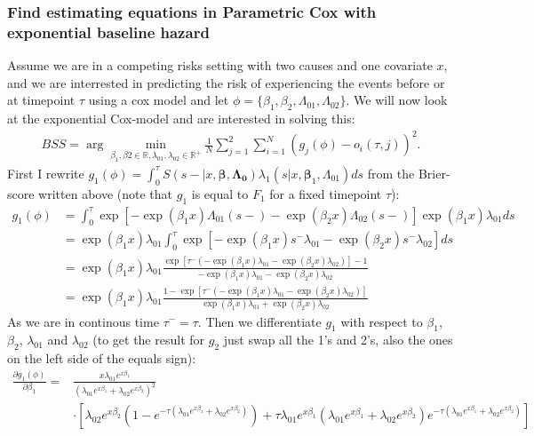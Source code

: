\documentclass{article}
\begin{document}
\subsubsection*{Find estimating equations in Parametric Cox with exponential baseline hazard}
\label{sec:org71aca03}
Assume we are in a competing risks setting with two causes and one covariate \(x\), and we are interrested in predicting the risk of experiencing the events before or at timepoint \(\tau\) using a cox model and let \(\phi = \{\beta_1,\beta_2,\Lambda_{01},\Lambda_{02}\}\). We will now look at the exponential Cox-model and are interested in solving this:
\begin{align*}
BSS=\arg\min_{\beta_1,\beta2\in\mathbb{R},\lambda_{01},\lambda_{02}\in\mathbb{R}^+}\frac{1}{N}\sum_{j = 1}^2\sum_{i = 1}^N\left(g_j(\phi)-o_i(\tau,j)\right)^2.
\end{align*}
First I rewrite \(g_1(\phi) = \int_0^{\tau} S(s-|x,\boldsymbol{\beta},\boldsymbol{\Lambda_0})\lambda_1(s|x,\boldsymbol{\beta}_1,\Lambda_{01})ds\) from the Brier-score written above (note that \(g_1\) is equal to \(F_1\) for a fixed timepoint \(\tau\)):
\begin{align*}
g_1(\phi)&= \int_0^{\tau}\exp\left[-\exp(\beta_1x)\Lambda_{01}(s-)-\exp(\beta_2x)\Lambda_{02}(s-)\right]\exp(\beta_1x)\lambda_{01}ds\\
&=\exp(\beta_1x)\lambda_{01}\int_0^{\tau}\exp\left[-\exp(\beta_1x)s^-\lambda_{01}-\exp(\beta_2x)s^-\lambda_{02}\right]ds\\
&=\exp(\beta_1x)\lambda_{01}\frac{\exp\left[\tau^-(-\exp(\beta_1x)\lambda_{01}-\exp(\beta_2x)\lambda_{02})\right]-1}{-\exp(\beta_1x)\lambda_{01}-\exp(\beta_2x)\lambda_{02}}\\
&=\exp(\beta_1x)\lambda_{01}\frac{1-\exp\left[\tau^-(-\exp(\beta_1x)\lambda_{01}-\exp(\beta_2x)\lambda_{02})\right]}{\exp(\beta_1x)\lambda_{01}+\exp(\beta_2x)\lambda_{02}}
\end{align*}
As we are in continous time \(\tau^-= \tau\). Then we differentiate \(g_1\) with respect to \(\beta_1\), \(\beta_2\), \(\lambda_{01}\) and \(\lambda_{02}\) (to get the result for \(g_2\) just swap all the 1's and 2's, also the ones on the left side of the equals sign):
\begin{align*}
\frac{\partial g_1(\phi)}{\partial\beta_1} = &\frac{x \lambda_{01} e^{x \beta_1}}{\left(\lambda_{01} e^{x \beta_1} + \lambda_{02} e^{x \beta_2}\right)^2}\\
&\cdot\left[
\lambda_{02} e^{x \beta_2}\left(1 - e^{-\tau\left(\lambda_{01} e^{x \beta_1} + \lambda_{02} e^{x \beta_2}\right)}\right)
+ \tau \lambda_{01} e^{x \beta_1}\left(\lambda_{01} e^{x \beta_1} + \lambda_{02} e^{x \beta_2}\right)e^{-\tau\left(\lambda_{01} e^{x \beta_1} + \lambda_{02} e^{x \beta_2}\right)}
\right]
\end{align*}
\end{document}
